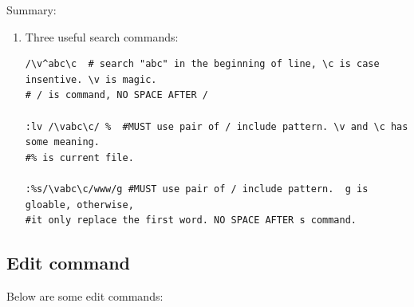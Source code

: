 \documentclass[paper=8.5in:11in, twoside, 12pt, pagesize=pdftex]{book}
\begin{document}
Summary:
		\begin{enumerate}
			\item Three useful search commands:
\begin{lstlisting}
/\v^abc\c  # search "abc" in the beginning of line, \c is case insentive. \v is magic. 
# / is command, NO SPACE AFTER /

:lv /\vabc\c/ %  #MUST use pair of / include pattern. \v and \c has some meaning. 
#% is current file.

:%s/\vabc\c/www/g #MUST use pair of / include pattern.  g is gloable, otherwise,
#it only replace the first word. NO SPACE AFTER s command. 	
\end{lstlisting}			
			
		\end{enumerate}

	
\subsection{Edit command}
	
Below are some edit commands:
		
\end{document}
